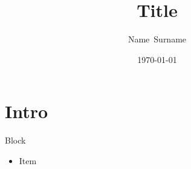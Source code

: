 \documentclass[aspectratio=43]{beamer}
\begin{document}
\def \transp{50}
\beamertemplatenavigationsymbolsempty
\title[]{Title}
\author{Name~Surname}
\date{\today}

\begin{frame}[plain]
  \titlepage
\end{frame}

\begin{frame}[plain]
  \tableofcontents
\end{frame}

\section{Intro}

\begin{frame}
\begin{block}{Block}
\begin{itemize}
	\item Item
\end{itemize}
\end{block}
\end{frame}
\end{document}
